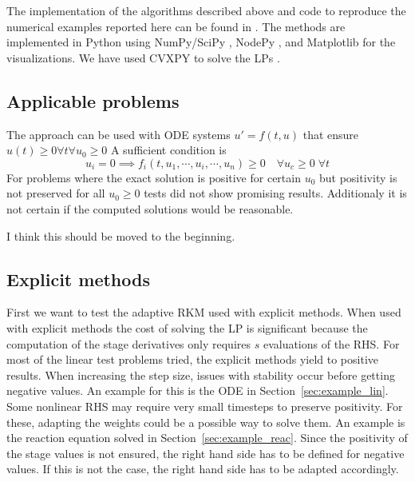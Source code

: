 \documentclass[a4paper]{article}
\numberwithin{equation}{section}
\theoremstyle{plain}
\theoremstyle{definition}
\numberwithin{theorem}{section}
\newcommand{\1}{\mathbbm{1}}
\newcommand{\todo}[1]{{\Large{\color{red}{#1}}}}
\begin{document}
The implementation of the algorithms described above and code to
reproduce the numerical examples reported here can be found in
\cite{repository}. \todo{TODO: New reopsitory with DOI} %
The methods are implemented in Python using NumPy/SciPy
\cite{virtanen2019scipy}, NodePy \cite{nodepy08}, and
Matplotlib \cite{hunter2007matplotlib} for the visualizations.
We have used CVXPY to solve the LPs \cite{cvxpy, cvxpy_rewriting}.
\todo{TODO: Which solver of CVXPY?} %



\subsection{Applicable problems}\label{sec:app_problem}
The approach can be used with ODE systems $u' = f(t,u)$ that ensure  $u(t) \geq 0 \forall t \forall {  u_0 \geq 0}$ 
A sufficient condition is  
\begin{equation}
u_i=0 \implies f_i(t,u_1,\cdots,u_i,\cdots,u_n) \geq 0 \quad \forall {u_c \geq 0}\; \forall {t}
\end{equation}
For problems where the exact solution is positive for certain $u_0$ but positivity is not preserved for all $u_0 \geq 0$ tests did not show promising results. Additionaly it is not certain if the computed solutions would be reasonable.

\todo{Note (HR)} I think this should be moved to the beginning.


\subsection{Explicit methods}\label{sec:Ex_expl}
First we want to test the adaptive RKM used with explicit methods.  
When used with explicit methods the cost of solving the LP is significant because the computation of the stage derivatives only requires $s$ evaluations of the RHS.
For most of the linear test problems tried, the explicit methods yield to positive results.  
When increasing the step size, issues with stability occur before getting negative values.  
An example for this is the ODE in Section~\ref{sec:example_lin}.
Some nonlinear RHS may require very small timesteps to preserve positivity.  
For these, adapting the weights could be a possible way to solve them. 
An example is the reaction equation solved in Section~\ref{sec:example_reac}.
Since the positivity of the stage values is not ensured, the right hand side has to be defined for negative values. If this is not the case, the right hand side has to be adapted accordingly.
\end{document}
